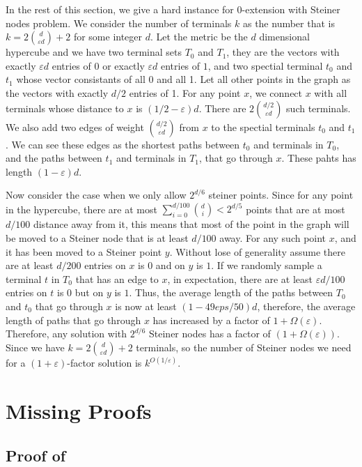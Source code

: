 \documentclass[11pt]{article}
\theoremstyle{definition}
\newcommand{\eps}{{\varepsilon}}
\begin{document}
In the rest of this section, we give a hard instance for 0-extension with Steiner nodes problem. We consider the number of terminals $k$ as the number that is $k=2\binom{d}{\eps d}+2$ for some integer $d$. Let the metric be the $d$ dimensional hypercube and we have two terminal sets $T_0$ and $T_1$, they are the vectors with exactly $\eps d$ entries of 0 or exactly $\eps d$ entries of $1$, and two spectial terminal $t_0$ and $t_1$ whose vector consistants of all 0 and all 1. Let all other points in the graph as the vectors with exactly $d/2$ entries of 1. For any point $x$, we connect $x$ with all terminals whose distance to $x$ is $(1/2-\eps)d$. There are $2\binom{d/2}{\eps d}$ such terminals. We also add two edges of weight $\binom{d/2}{\eps d}$ from $x$ to the spectial terminals $t_0$ and $t_1$. We can see these edges as the shortest paths between $t_0$ and terminals in $T_0$, and the paths between $t_1$ and terminals in $T_1$, that go through $x$. These pahts has length $(1-\eps)d$.

Now consider the case when we only allow $2^{d/6}$ steiner points. Since for any point in the hypercube, there are at most $\sum_{i=0}^{d/100} \binom{d}{i}<2^{d/5}$ points that are at most $d/100$ distance away from it, this means that most of the point in the graph will be moved to a Steiner node that is at least $d/100$ away. For any such point $x$, and it has been moved to a Steiner point $y$. Without lose of generality assume there are at least $d/200$ entries on $x$ is $0$ and on $y$ is $1$. If we randomly sample a terminal $t$ in $T_0$ that has an edge to $x$, in expectation, there are at least $\eps d/100$ entries on $t$ is $0$ but on $y$ is $1$. Thus, the average length of the paths between $T_0$ and $t_0$ that go through $x$ is now at least $(1-49eps/50)d$, therefore, the average length of paths that go through $x$ has increased by a factor of $1+\Omega(\eps)$. Therefore, any solution with $2^{d/6}$ Steiner nodes has a factor of $(1+\Omega(\eps))$. Since we have $k = 2\binom{d}{\eps d}+2$ terminals, so the number of Steiner nodes we need for a $(1+\eps)$-factor solution is $k^{O(1/\eps)}$.

\fi
 
\appendix
\section{Missing Proofs}

\subsection{Proof of }
\label{apd: Proof of lem: divide}
\end{document}
